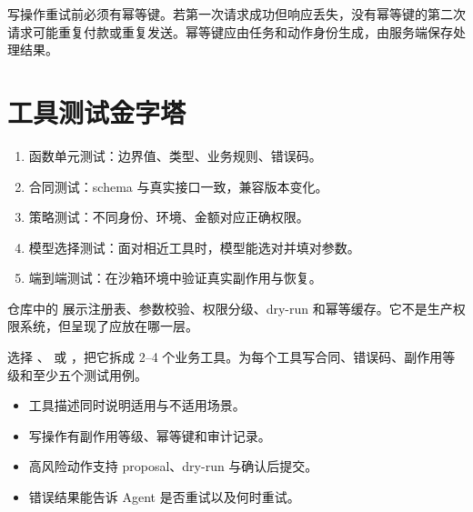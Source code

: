 写操作重试前必须有幂等键。若第一次请求成功但响应丢失，没有幂等键的第二次请求可能重复付款或重复发送。幂等键应由任务和动作身份生成，由服务端保存处理结果。

\section{工具测试金字塔}

\begin{enumerate}
  \item 函数单元测试：边界值、类型、业务规则、错误码。
  \item 合同测试：schema 与真实接口一致，兼容版本变化。
  \item 策略测试：不同身份、环境、金额对应正确权限。
  \item 模型选择测试：面对相近工具时，模型能选对并填对参数。
  \item 端到端测试：在沙箱环境中验证真实副作用与恢复。
\end{enumerate}

仓库中的  展示注册表、参数校验、权限分级、dry-run 和幂等缓存。它不是生产权限系统，但呈现了应放在哪一层。

\begin{practice}[重构一个危险工具]
选择 、 或 ，把它拆成 2--4 个业务工具。为每个工具写合同、错误码、副作用等级和至少五个测试用例。
\end{practice}

\begin{checkpoint}
\begin{itemize}
  \item \checkbox 工具描述同时说明适用与不适用场景。
  \item \checkbox 写操作有副作用等级、幂等键和审计记录。
  \item \checkbox 高风险动作支持 proposal、dry-run 与确认后提交。
  \item \checkbox 错误结果能告诉 Agent 是否重试以及何时重试。
\end{itemize}
\end{checkpoint}

